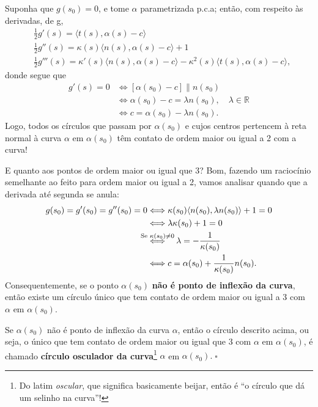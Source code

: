 \documentclass[../differential_geometry.tex]{subfiles}
\begin{document}
Suponha que \(g(s_{0})=0\), e tome \(\alpha \) parametrizada p.c.a; então, com respeito às derivadas, de g,
\begin{align*}
	 & \frac{1}{2}g'(s)=\langle t(s), \alpha (s)-c \rangle                                                               \\
	 & \frac{1}{2}g''(s) = \kappa (s)\langle n(s), \alpha (s)-c \rangle+1                                                \\
	 & \frac{1}{2}g'''(s)=\kappa '(s)\langle n(s), \alpha (s)-c \rangle-\kappa^{2}(s)\langle t(s), \alpha (s)-c \rangle,
\end{align*}
donde segue que
\begin{align*}
	g'(s) = 0 & \Longleftrightarrow [\alpha (s_{0})-c]\parallel n(s_{0})                             \\
	          & \Longleftrightarrow \alpha (s_{0})-c = \lambda n(s_{0}),\quad \lambda \in \mathbb{R} \\
	          & \Longleftrightarrow c=\alpha (s_{0})-\lambda n(s_{0}).
\end{align*}
Logo, todos os círculos que passam por \(\alpha (s_{0})\) e cujos centros pertencem à reta normal à curva \(\alpha \) em \(\alpha (s_{0})\) têm contato de ordem maior ou igual a 2 com a curva!

E quanto aos pontos de ordem maior ou igual que 3? Bom, fazendo um raciocínio semelhante ao feito para ordem maior ou igual a 2, vamos analisar quando que a derivada até segunda se anula:
\begin{align*}
	g(s_{0})=g'(s_{0})=g''(s_{0})=0 & \Longleftrightarrow \kappa (s_{0})\langle n(s_{0}), \lambda n(s_{0}) \rangle +1=0                                  \\
	                                & \Longleftrightarrow \lambda \kappa (s_{0})+1=0                                                                     \\
	                                & \stackrel{\mathclap{\text{Se }\kappa (s_{0})\neq 0}}\Longleftrightarrow \quad \lambda = - \frac{1}{\kappa (s_{0})} \\
	                                & \Longleftrightarrow  c = \alpha (s_{0})+\frac{1}{\kappa (s_{0})}n(s_{0}).
\end{align*}
Consequentemente, se o ponto \(\alpha (s_{0})\) \textbf{não é ponto de inflexão da curva}, então existe um círculo único que tem contato de ordem maior ou igual a 3 com \(\alpha \) em \(\alpha (s_{0}).\)
\begin{def*}
	Se \(\alpha (s_{0})\) não é ponto de inflexão da curva \(\alpha \), então o círculo descrito acima, ou seja, o único que tem contato de ordem maior ou igual que 3 com \(\alpha \) em \(\alpha (s_{0})\), é chamado \textbf{círculo osculador da curva}\footnote{Do latim \textit{oscular}, que significa basicamente beijar, então é ``o círculo que dá um selinho na curva''!} \(\alpha \) em \(\alpha (s_{0}).\; \square\)
\end{def*}
\end{document}
